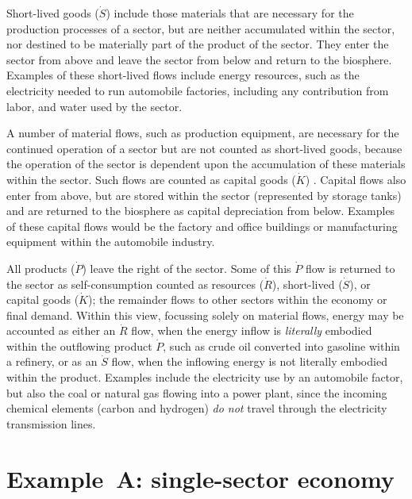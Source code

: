 Short-lived goods ($\dot{S}$)  
include those materials 
that are necessary for the production processes of a sector, 
but are neither accumulated within the sector, 
nor destined to be materially part of the product of the sector. 
They enter the sector from above and leave the sector from
below and return to the biosphere. 
Examples of these short-lived flows include energy resources, such as
the electricity needed to run automobile factories,
including any contribution from labor, 
and water used by the sector. 

A number of material flows, such as production equipment,
are necessary for the continued operation of a sector 
but are not counted as short-lived goods, 
because the operation of the sector is dependent 
upon the accumulation of these materials within the sector. 
Such flows are counted as capital goods ($\dot{K}$)
. 
Capital flows also enter from above, 
but are stored within the sector (represented by storage tanks) 
and are returned to the biosphere as capital depreciation from below.
Examples of these capital flows would be the factory and office buildings or
manufacturing equipment within the automobile industry.

All products ($\dot{P}$) leave the right of the sector. 
Some of this $\dot{P}$ flow is returned to the sector as self-consumption 
counted as resources ($\dot{R}$), 
short-lived ($\dot{S}$), or 
capital goods ($\dot{K}$); 
the remainder flows to other sectors within the economy or final demand. 
Within this view, focussing solely on material flows, energy may be accounted
as either an $\dot{R}$ flow, when the energy inflow is \emph{literally} embodied
within the outflowing product $\dot{P}$, such as crude oil converted into
gasoline within a refinery, or as an $\dot{S}$ flow, when the inflowing energy
is not literally embodied within the product. Examples include the electricity
use by an automobile factor, but also the coal or natural gas flowing into a
power plant, since the incoming chemical elements (carbon and hydrogen) \emph{do
not} travel through the electricity transmission lines.



\section{Example~A: single-sector economy} %
\label{sec:A_materials}

